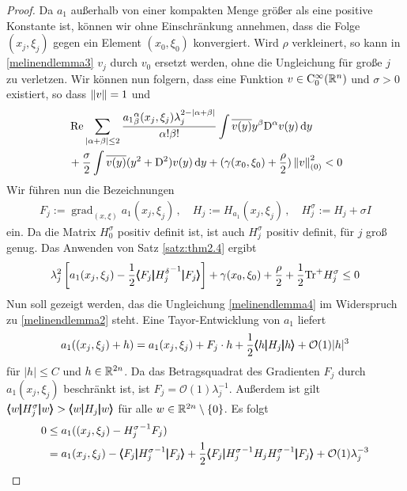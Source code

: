 \begin{proof}
Da $a_1$ außerhalb von einer kompakten Menge größer als eine positive Konstante ist, können wir ohne Einschränkung annehmen, dass die Folge $(x_j,\xi_j)$ gegen ein Element $(x_0,\xi_0)$ konvergiert.
Wird $\rho$ verkleinert, so kann in \eqref{melinendlemma3} $v_j$ durch $v_0$ ersetzt werden, ohne die Ungleichung für große $j$ zu verletzen.
Wir können nun folgern, dass eine Funktion $v\in\mathrm C^\infty_0(\mathbb R^n)$ und $\sigma>0$ existiert, so dass $\left\lVert v\right\rVert =1$ und
\begin{align}
\begin{split}
&\operatorname{Re} \sum_{|\alpha+\beta|\le 2} \frac{{a_1}^\alpha_\beta(x_j,\xi_j)\lambda_j^{2-|\alpha+\beta|}}{\alpha!\beta!}\int\overline{v(y)}y^\beta\mathrm D^\alpha v(y)\,\mathrm d y\\
& + \frac \sigma 2 \int \overline{v(y)}(y^2 + \mathrm D^2)v(y) \,\mathrm d y+ (\gamma(x_0,\xi_0)+ \frac\rho 2)\left\lVert v\right\rVert _{(0)}^2 < 0
\end{split}
\end{align}
Wir führen nun die Bezeichnungen
\begin{align}
F_j := \operatorname{grad}_{(x,\xi)}a_1(x_j,\xi_j)\,,\quad H_j:=H_{a_1}(x_j,\xi_j)\,,\quad H_j^\sigma:=H_j  + \sigma I
\end{align}
ein. Da die Matrix $H_0^\sigma$ positiv definit ist, ist auch $H_j^\sigma$ positiv definit, für $j$ groß genug. Das Anwenden von Satz \ref{satz:thm2.4} ergibt
\begin{align}\label{melinendlemma4}
\lambda_j^2\left[ a_1(x_j,\xi_j) - \frac{1}{2}\pmb\langle F_j\pmb|{H_j^\delta}^{-1}\pmb|F_j\pmb\rangle \right] + \gamma(x_0,\xi_0) + \frac \rho 2 + \frac 1 2 \mathrm{Tr}^+ H_j^\sigma\le 0
\end{align}
Nun soll gezeigt werden, das die Ungleichung \eqref{melinendlemma4} im Widerspruch zu \eqref{melinendlemma2} steht. Eine Tayor-Entwicklung von $a_1$ liefert
\begin{align}
a_1((x_j,\xi_j) + h ) = a_1(x_j,\xi_j) + F_j\cdot h + \frac 1 2 \pmb\langle h\pmb|H_j\pmb|h\pmb\rangle + \mathcal O(1)|h|^3
\end{align}
für $|h|\le C$ und $h\in\mathbb R^{2n}$. Da das Betragsquadrat des Gradienten $F_j$ durch $a_1(x_j,\xi_j)$ beschränkt ist, ist $F_j=\mathcal O(1)\lambda_j^{-1}$. Außerdem ist gilt $\pmb\langle w\pmb|H_j^\sigma\pmb|w\pmb\rangle>\pmb\langle w\pmb|H_j\pmb|w\pmb\rangle$ für alle $w\in\mathbb R^{2n}\setminus\{0\}$. Es folgt
\begin{align}
\begin{split}
0&\le a_1((x_j,\xi_j)- {H_j^\sigma}^{-1}F_j) \\&= a_1(x_j,\xi_j) - \cspro{F_j}{{H_j^\sigma}^{-1}}{F_j} + \frac 1 2\cspro{F_j}{{H_j^\sigma}^{-1}H_j{H_j^\sigma}^{-1}}{F_j} + \mathcal O(1)\lambda_j^{-3}\\

\end{split}
\end{align}
\end{proof}
